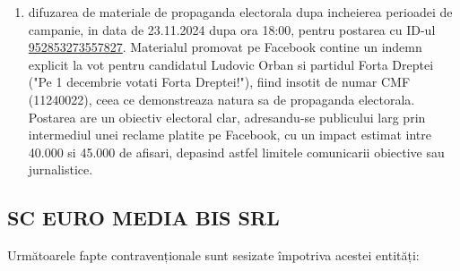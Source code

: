 \documentclass[a4paper,12pt]{article}
\begin{document}
\begin{enumerate}[leftmargin=*, label=\arabic*.)]
    \item difuzarea de materiale de propaganda electorala dupa incheierea perioadei de campanie, in data de 23.11.2024 dupa ora 18:00, pentru postarea cu ID-ul \href{https://www.facebook.com/ads/library/?id=952853273557827}{952853273557827}. Materialul promovat pe Facebook contine un indemn explicit la vot pentru candidatul Ludovic Orban si partidul Forta Dreptei ("Pe 1 decembrie votati Forta Dreptei!"), fiind insotit de numar CMF (11240022), ceea ce demonstreaza natura sa de propaganda electorala. Postarea are un obiectiv electoral clar, adresandu-se publicului larg prin intermediul unei reclame platite pe Facebook, cu un impact estimat intre 40.000 si 45.000 de afisari, depasind astfel limitele comunicarii obiective sau jurnalistice.
\end{enumerate}

\vspace{0.5cm}

\subsection{SC EURO MEDIA BIS SRL}
Următoarele fapte contravenționale sunt sesizate împotriva acestei entități:
\end{document}
